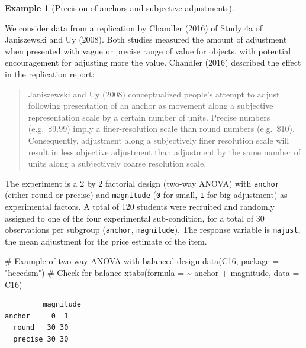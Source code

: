 \documentclass[
  11pt,
  letterpaper,
]{scrbook}
\newenvironment{Shaded}{\begin{snugshade}}{\end{snugshade}}
\newcommand{\AttributeTok}[1]{\textcolor[rgb]{0.40,0.45,0.13}{#1}}
\newcommand{\CommentTok}[1]{\textcolor[rgb]{0.37,0.37,0.37}{#1}}
\newcommand{\FunctionTok}[1]{\textcolor[rgb]{0.28,0.35,0.67}{#1}}
\newcommand{\NormalTok}[1]{\textcolor[rgb]{0.00,0.23,0.31}{#1}}
\newcommand{\SpecialCharTok}[1]{\textcolor[rgb]{0.37,0.37,0.37}{#1}}
\newcommand{\StringTok}[1]{\textcolor[rgb]{0.13,0.47,0.30}{#1}}
\theoremstyle{definition}
\newtheorem{example}{Example}[chapter]
\theoremstyle{definition}
\theoremstyle{remark}
\begin{document}
\begin{example}[Precision of anchors and subjective
adjustments]\protect\hypertarget{exm-anchor}{}\label{exm-anchor}

We consider data from a replication by Chandler (2016) of Study 4a of
Janiszewski and Uy (2008). Both studies measured the amount of
adjustment when presented with vague or precise range of value for
objects, with potential encouragement for adjusting more the value.
Chandler (2016) described the effect in the replication report:

\begin{quote}
Janiszewski and Uy (2008) conceptualized people's attempt to adjust
following presentation of an anchor as movement along a subjective
representation scale by a certain number of units. Precise numbers
(e.g.~\$9.99) imply a finer-resolution scale than round numbers
(e.g.~\$10). Consequently, adjustment along a subjectively finer
resolution scale will result in less objective adjustment than
adjustment by the same number of units along a subjectively coarse
resolution scale.
\end{quote}

The experiment is a 2 by 2 factorial design (two-way ANOVA) with
\texttt{anchor} (either round or precise) and \texttt{magnitude}
(\texttt{0} for small, \texttt{1} for big adjustment) as experimental
factors. A total of 120 students were recruited and randomly assigned to
one of the four experimental sub-condition, for a total of 30
observations per subgroup (\texttt{anchor}, \texttt{magnitude}). The
response variable is \texttt{majust}, the mean adjustment for the price
estimate of the item.

\begin{Shaded}
\begin{Highlighting}[]
\CommentTok{\# Example of two{-}way ANOVA with balanced design}
\FunctionTok{data}\NormalTok{(C16, }\AttributeTok{package =} \StringTok{"hecedsm"}\NormalTok{)}
\CommentTok{\# Check for balance}
\FunctionTok{xtabs}\NormalTok{(}\AttributeTok{formula =} \SpecialCharTok{\textasciitilde{}}\NormalTok{ anchor }\SpecialCharTok{+}\NormalTok{ magnitude,}
      \AttributeTok{data =}\NormalTok{ C16)}
\end{Highlighting}
\end{Shaded}

\begin{verbatim}
         magnitude
anchor     0  1
  round   30 30
  precise 30 30
\end{verbatim}


\end{example}
\end{document}
